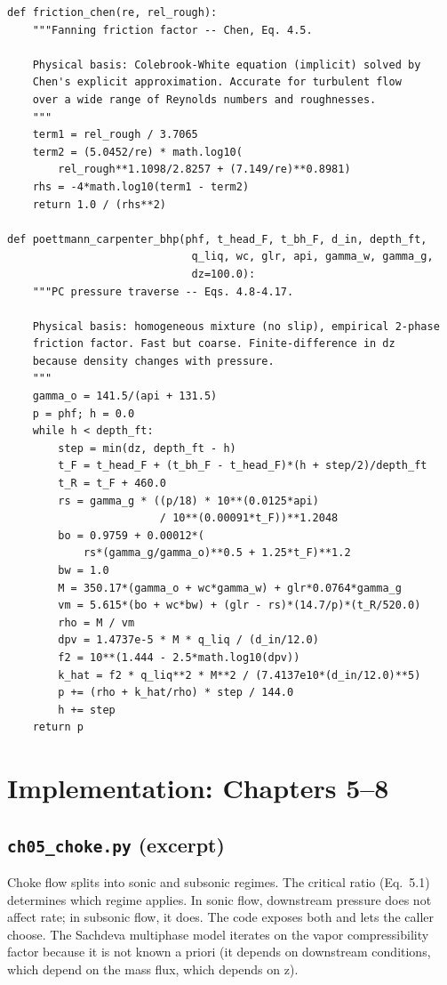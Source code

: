 \documentclass[11pt,a4paper,openany]{book}
\newcommand{\code}[1]{\texttt{#1}}
\begin{document}
\begin{lstlisting}
def friction_chen(re, rel_rough):
    """Fanning friction factor -- Chen, Eq. 4.5.

    Physical basis: Colebrook-White equation (implicit) solved by
    Chen's explicit approximation. Accurate for turbulent flow
    over a wide range of Reynolds numbers and roughnesses.
    """
    term1 = rel_rough / 3.7065
    term2 = (5.0452/re) * math.log10(
        rel_rough**1.1098/2.8257 + (7.149/re)**0.8981)
    rhs = -4*math.log10(term1 - term2)
    return 1.0 / (rhs**2)

def poettmann_carpenter_bhp(phf, t_head_F, t_bh_F, d_in, depth_ft,
                             q_liq, wc, glr, api, gamma_w, gamma_g,
                             dz=100.0):
    """PC pressure traverse -- Eqs. 4.8-4.17.

    Physical basis: homogeneous mixture (no slip), empirical 2-phase
    friction factor. Fast but coarse. Finite-difference in dz
    because density changes with pressure.
    """
    gamma_o = 141.5/(api + 131.5)
    p = phf; h = 0.0
    while h < depth_ft:
        step = min(dz, depth_ft - h)
        t_F = t_head_F + (t_bh_F - t_head_F)*(h + step/2)/depth_ft
        t_R = t_F + 460.0
        rs = gamma_g * ((p/18) * 10**(0.0125*api)
                        / 10**(0.00091*t_F))**1.2048
        bo = 0.9759 + 0.00012*(
            rs*(gamma_g/gamma_o)**0.5 + 1.25*t_F)**1.2
        bw = 1.0
        M = 350.17*(gamma_o + wc*gamma_w) + glr*0.0764*gamma_g
        vm = 5.615*(bo + wc*bw) + (glr - rs)*(14.7/p)*(t_R/520.0)
        rho = M / vm
        dpv = 1.4737e-5 * M * q_liq / (d_in/12.0)
        f2 = 10**(1.444 - 2.5*math.log10(dpv))
        k_hat = f2 * q_liq**2 * M**2 / (7.4137e10*(d_in/12.0)**5)
        p += (rho + k_hat/rho) * step / 144.0
        h += step
    return p
\end{lstlisting}

\chapter{Implementation: Chapters 5--8}

\section{\code{ch05\_choke.py} (excerpt)}

\begin{theory}
Choke flow splits into sonic and subsonic regimes. The critical
ratio (Eq.~5.1) determines which regime applies. In sonic flow,
downstream pressure does not affect rate; in subsonic flow, it does.
The code exposes both and lets the caller choose. The Sachdeva
multiphase model iterates on the vapor compressibility factor because
it is not known a priori (it depends on downstream conditions, which
depend on the mass flux, which depends on z).
\end{theory}
\end{document}
